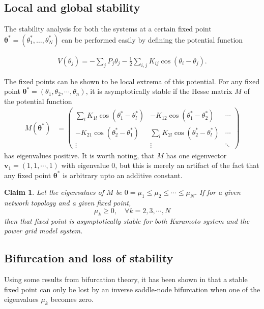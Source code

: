 \documentclass[10pt,aps,pra,onecolumn,superscriptaddress]{revtex4-1}
\renewcommand{\vec}[1]{\boldsymbol{#1}}
\newtheorem{claim}{Claim}
\begin{document}
\subsection{Local and global stability}
The stability analysis for both the systems at a certain fixed point 
$\vec{\theta^*}=(\theta_1^*,\ldots,\theta_N^*)$ can be performed easily by 
defining the potential function

\begin{align}
\label{eq-potential}
V(\theta_j)=- \sum_j P_j \theta_j - \frac{1}{2} \sum_{i,j} K_{ij} \cos(\theta_i - \theta_j).
\end{align}

The fixed points can be shown to be local extrema of this potential.  For any 
fixed point $\vec{\theta}^*=(\theta_1,\theta_2,\cdots,\theta_n)$, it
is asymptotically stable if the Hesse matrix $M$ of the potential 
function 
\begin{align}
\label{eq-M}
   M(\vec{\theta^*})&=\begin{pmatrix}
      \sum_l K_{1l} \cos{(\theta_1^*-\theta_l^*)} & 
              - K_{12}\cos{(\theta_1^*-\theta_2^*)} & \cdots \\
     - K_{21}\cos{(\theta_2^*-\theta_1^*)} & 
               \sum_l K_{2l} \cos{(\theta_2^*-\theta_l^*)} & \cdots \\
       \vdots & \vdots  & \ddots 
  \end{pmatrix}
\end{align}
has eigenvalues positive.  It is worth noting, that $M$ has one eigenvector 
$\vec{v}_1=(1,1,\cdots,1)$ with eigenvalue $0$, but this is merely an artifact 
of the fact that any fixed point $\vec{\theta^*}$ is arbitrary upto an 
additive constant.  

\begin{claim}
Let the eigenvalues of $M$ be $0=\mu_1\leq\mu_2\leq\cdots\leq \mu_N$.  If for a given network topology and a given fixed point, 
 \[
\mu_k\ge 0,\quad\forall k=2,3,\cdots,N
 \]
then that fixed point is \emph{asymptotically stable} for both 
Kuramoto system and the power grid model system.  
\end{claim}

\subsection{Bifurcation and loss of stability}
Using some results from bifurcation theory, it has been shown in
\cite{epjst14} that a stable fixed point can only be lost by an inverse 
saddle-node bifurcation when one of the eigenvalues $\mu_k$ becomes zero.  
\end{document}
